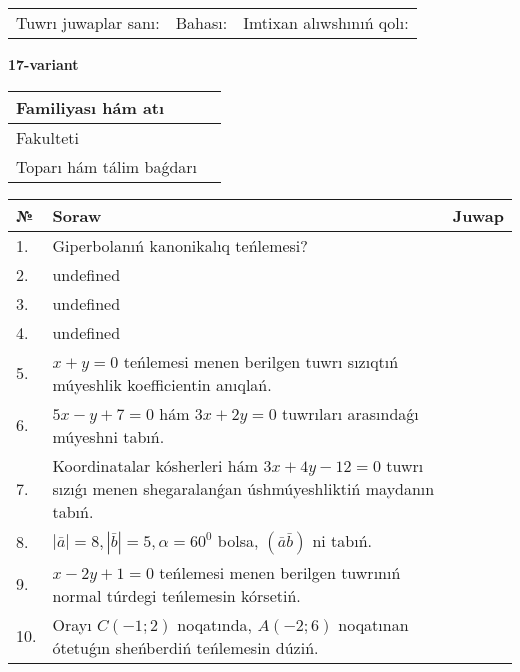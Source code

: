 \documentclass{article}
\begin{document}
\vspace{0.7cm}

\begin{tabular}{lll}
Tuwrı juwaplar sanı: \underline{\hspace{1cm}} & 
Bahası: \underline{\hspace{1cm}} & 
Imtixan alıwshınıń qolı: \underline{\hspace{2cm}} \\
\end{tabular}

\egroup

\newpage


\textbf{17-variant}\\

\bgroup
\def\arraystretch{1.6} %

\begin{tabular}{|m{5.7cm}|m{9.5cm}|}
\hline
Familiyası hám atı & \\
\hline
Fakulteti  & \\
\hline
Toparı hám tálim baǵdarı  & \\
\hline
\end{tabular}

\vspace{0.7cm}

\begin{tabular}{|m{0.7cm}|m{10cm}|m{4cm}|}
\hline
№ & Soraw & Juwap \\
\hline
1. & Giperbolanıń kanonikalıq teńlemesi? &  \\
\hline
2. & undefined &  \\
\hline
3. & undefined &  \\
\hline
4. & undefined &  \\
\hline
5. & \(x + y = 0\) teńlemesi menen berilgen tuwrı sızıqtıń múyeshlik koefficientin anıqlań. &  \\
\hline
6. & \(5 x - y + 7 = 0\) hám \(3 x + 2 y = 0\) tuwrıları arasındaǵı múyeshni tabıń. &  \\
\hline
7. & Koordinatalar kósherleri hám \( 3 x + 4 y - 12 = 0 \) tuwrı sızıǵı menen shegaralanǵan úshmúyeshliktiń maydanın tabıń. &  \\
\hline
8. & \(\left| \bar{a} \right| = 8, \left| \bar{b} \right| = 5, \alpha = 60^{0}\) bolsa, \(( \bar{a}\bar{b} )\) ni tabıń. &  \\
\hline
9. & \(x - 2 y + 1 = 0\) teńlemesi menen berilgen tuwrınıń normal túrdegi teńlemesin kórsetiń. &  \\
\hline
10. & Orayı \(C (- 1;2)\) noqatında, \(A (- 2;6 )\) noqatınan ótetuǵın sheńberdiń teńlemesin dúziń. & \\
\hline
\end{tabular}
\end{document}
